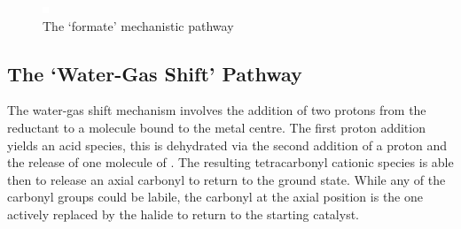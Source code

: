 \begin{figure}[!htb]
 \begin{center}
  \includegraphics[clip=true, width=\textwidth]{images/insertgraphic.eps}
 \end{center}
\caption{The `formate' mechanistic pathway}
\label{fig.formate}
\end{figure} 

\subsection{The `Water-Gas Shift' Pathway}
The water-gas shift mechanism involves the addition of two protons from the reductant to a  molecule bound to the metal centre. The first proton addition yields an acid species, this is dehydrated via the second addition of a proton and the release of one molecule of . The resulting tetracarbonyl cationic species is able then to release an axial carbonyl to return to the ground state. While any of the carbonyl groups could be labile, the carbonyl at the axial position is the one actively replaced by the halide to return to the starting catalyst\autocite{shaver1992}. 

